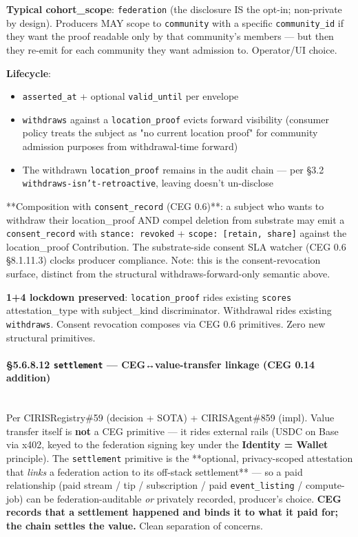 \documentclass[10pt]{article}
\begin{document}
\textbf{Typical cohort\_scope}: \texttt{federation} (the disclosure IS the opt-in; non-private by design). Producers MAY scope to \texttt{community} with a specific \texttt{community\_id} if they want the proof readable only by that community's members — but then they re-emit for each community they want admission to. Operator/UI choice.


\textbf{Lifecycle}:


\begin{itemize}\setlength\itemsep{0pt}
\item \texttt{asserted\_at} + optional \texttt{valid\_until} per envelope
\item \texttt{withdraws} against a \texttt{location\_proof} evicts forward visibility (consumer policy treats the subject as "no current location proof" for community admission purposes from withdrawal-time forward)
\item The withdrawn \texttt{location\_proof} remains in the audit chain — per §3.2 \texttt{withdraws-isn't-retroactive}, leaving doesn't un-disclose
\end{itemize}


**Composition with \texttt{consent\_record} (CEG 0.6)**: a subject who wants to withdraw their location\_proof AND compel deletion from substrate may emit a \texttt{consent\_record} with \texttt{stance: revoked} + \texttt{scope: [retain, share]} against the location\_proof Contribution. The substrate-side consent SLA watcher (CEG 0.6 §8.1.11.3) clocks producer compliance. Note: this is the consent-revocation surface, distinct from the structural withdraws-forward-only semantic above.


\textbf{1+4 lockdown preserved}: \texttt{location\_proof} rides existing \texttt{scores} attestation\_type with subject\_kind discriminator. Withdrawal rides existing \texttt{withdraws}. Consent revocation composes via CEG 0.6 primitives. Zero new structural primitives.


\paragraph{§5.6.8.12 \texttt{settlement} — CEG↔value-transfer linkage (CEG 0.14 addition)}\mbox{}\\


Per CIRISRegistry\#59 (decision + SOTA) + CIRISAgent\#859 (impl). Value transfer itself is \textbf{not} a CEG primitive — it rides external rails (USDC on Base via x402, keyed to the federation signing key under the \textbf{Identity = Wallet} principle). The \texttt{settlement} primitive is the **optional, privacy-scoped attestation that \textit{links} a federation action to its off-stack settlement** — so a paid relationship (paid stream / tip / subscription / paid \texttt{event\_listing} / compute-job) can be federation-auditable \textit{or} privately recorded, producer's choice. \textbf{CEG records that a settlement happened and binds it to what it paid for; the chain settles the value.} Clean separation of concerns.
\end{document}
